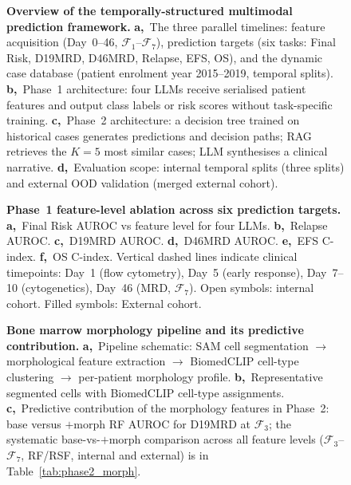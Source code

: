 \documentclass[pdflatex,sn-nature]{sn-jnl}
\begin{document}

\begin{figure}[ht]
\caption{\textbf{Overview of the temporally-structured multimodal
prediction framework.}
\textbf{a,}~The three parallel timelines: feature acquisition
(Day~0--46, $\mathcal{F}_1$–$\mathcal{F}_{7}$), prediction targets
(six tasks: Final Risk, D19MRD, D46MRD, Relapse, EFS, OS), and the
dynamic case database (patient enrolment year 2015--2019, temporal
splits).
\textbf{b,}~Phase~1 architecture: four LLMs receive serialised patient
features and output class labels or risk scores without task-specific
training.
\textbf{c,}~Phase~2 architecture: a decision tree trained on historical
cases generates predictions and decision paths; RAG retrieves the
$K=5$ most similar cases; LLM synthesises a clinical narrative.
\textbf{d,}~Evaluation scope: internal temporal splits (three splits) and
external OOD validation (merged external cohort).}
\label{fig:overview}
\end{figure}

\begin{figure}[ht]
\caption{\textbf{Phase~1 feature-level ablation across six prediction
targets.}
\textbf{a,}~Final Risk AUROC vs feature level for four LLMs.
\textbf{b,}~Relapse AUROC. \textbf{c,}~D19MRD AUROC.
\textbf{d,}~D46MRD AUROC. \textbf{e,}~EFS C-index.
\textbf{f,}~OS C-index.
Vertical dashed lines indicate clinical timepoints: Day~1 (flow
cytometry), Day~5 (early response), Day~7--10
(cytogenetics), Day~46 (MRD, $\mathcal{F}_7$).
Open symbols: internal cohort. Filled symbols: External cohort.}
\label{fig:ablation}
\end{figure}

\begin{figure}[ht]
\caption{\textbf{Bone marrow morphology pipeline and its predictive
contribution.}
\textbf{a,}~Pipeline schematic: SAM cell segmentation
$\rightarrow$ morphological feature extraction $\rightarrow$
BiomedCLIP cell-type clustering $\rightarrow$ per-patient morphology
profile.
\textbf{b,}~Representative segmented cells with BiomedCLIP cell-type
assignments.
\textbf{c,}~Predictive contribution of the morphology features in
Phase~2: base versus $+$morph RF AUROC for D19MRD at $\mathcal{F}_3$;
the systematic base-vs-$+$morph comparison across all feature levels
($\mathcal{F}_3$--$\mathcal{F}_7$, RF/RSF, internal and external) is
in Table~\ref{tab:phase2_morph}.}
\label{fig:morph}
\end{figure}
\end{document}
